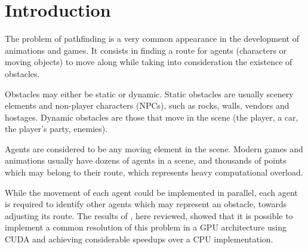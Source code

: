 \section{Introduction}

The problem of pathfinding is a very common appearance in the development of animations and games. It consists in finding a route for agents (characters or moving objects) to move along while taking into consideration the existence of obstacles.

Obstacles may either be static or dynamic. Static obstacles are usually scenery elements and non-player characters (NPCs), such as rocks, walls, vendors and hostages. Dynamic obstacles are those that move in the scene (the player, a car, the player's party, enemies).

Agents are considered to be any moving element in the scene.
Modern games and animations usually have dozens of agents in a scene, and thousands of points which may belong to their route, which represents heavy computational overload.

While the movement of each agent could be implemented in parallel, each agent is required to identify other agents which may represent an obstacle, towards adjusting its route.
The results of \cite{bleiweiss08}, here reviewed, showed that it is possible to implement a common resolution of this problem in a GPU architecture using CUDA and achieving considerable speedups over a CPU implementation.